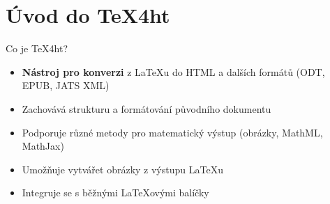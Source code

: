 
\begin{abstract}
Přednáška představí sadu šablon pro nástroj TeX4ht, který slouží k převodu
LaTeXových dokumentů do HTML. Tyto šablony výrazně usnadňují publikaci různých
typů dokumentů na webu a přinášejí moderní možnosti zpracování a automatizace.

První šablona je určena pro převod knižních dokumentů do webové podoby.
Umožňuje rozdělení textu do jednotlivých kapitol s automaticky generovanou
navigací a podporou responzivního designu, takže je výsledek dobře čitelný i na
mobilních zařízeních.

Druhá šablona slouží k tvorbě staticky generovaných blogů. Každý příspěvek je
psán jako samostatný LaTeXový dokument, který je pomocí TeX4ht převeden do
HTML. Následně jsou tyto články zpracovány statickým generátorem webů, jako je
například Jekyll, který se postará o sestavení celého blogu, vytvoření
rozcestníků, archivů a další navigace.

Třetí šablona je zaměřena na převod prezentací vytvořených v prostředí Beamer
do formy tzv. handoutů – přehledových materiálů pro posluchače. Výsledkem je
čitelný a dobře strukturovaný webový dokument vhodný pro sdílení po přednášce.

Všechny šablony jsou navrženy tak, aby fungovaly v rámci GitHub Actions. To
znamená, že dokumenty mohou být automaticky zkompilovány a publikovány online
pokaždé, když dojde ke změně v repozitáři. Tento přístup zajišťuje, že je
webová verze dokumentu vždy aktuální.
\end{abstract}

\tableofcontents

\section{Úvod do TeX4ht}

\begin{frame}{Co je TeX4ht?}
\begin{itemize}
    \item \textbf{Nástroj pro konverzi} z LaTeXu do HTML a dalších formátů (ODT, EPUB, JATS XML)
    \item Zachovává strukturu a formátování původního dokumentu
    \item Podporuje různé metody pro matematický výstup (obrázky, MathML, MathJax)
    \item Umožňuje vytvářet obrázky z výstupu \LaTeX u
    \item Integruje se s běžnými LaTeXovými balíčky
\end{itemize}
\end{frame}

